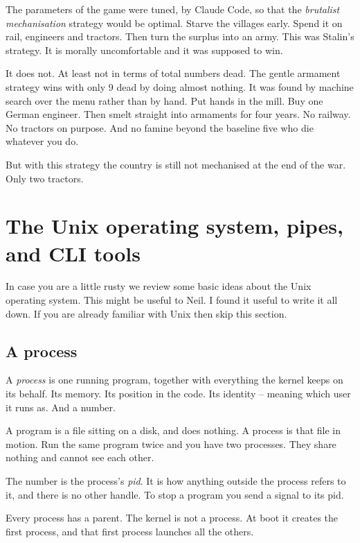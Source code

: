 \documentclass[11pt,a4paper]{article}
\begin{document}
The parameters of the game were tuned, by Claude Code, so that the \emph{brutalist mechanisation}
strategy would be optimal. Starve the villages
early. Spend it on rail, engineers and tractors. Then turn the surplus into an army. This was
Stalin's strategy. It is morally uncomfortable and it was supposed to win.

It does not. At least not in terms of total numbers dead. The gentle armament strategy wins with
only 9 dead by doing almost nothing. It was found by machine search over the menu rather than by
hand. Put hands in the mill. Buy one German engineer. Then smelt straight into armaments for four
years. No railway. No tractors on purpose. And no famine beyond the baseline five who die whatever
you do.

But with this strategy the country is still not mechanised at the end of the war. Only two
tractors.


\newpage

\section{The Unix operating system, pipes, and CLI tools}
\label{sec:unix}

In case you are a little rusty we review some basic ideas about the Unix operating system. This
might be useful to Neil. I found it useful to write it all down. If you are already familiar with
Unix then skip this section.

\subsection{A process}

A \emph{process} is one running program, together with everything the kernel keeps on its
behalf. Its memory. Its position in the code. Its identity -- meaning which user it runs as. And a
number.

A program is a file sitting on a disk, and does nothing. A process is that file in motion. Run the
same program twice and you have two processes. They share nothing and cannot see each other.

The number is the process's \emph{pid}. It is how anything outside the process refers to it, and
there is no other handle. To stop a program you send a signal to its pid.

Every process has a parent. The kernel is not a process. At boot it creates the first process, and
that first process launches all the others.
\end{document}

